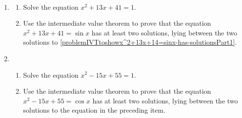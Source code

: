 ~
\begin{enumerate}[ref={\fcProblemRef}]
\item \label{problemIVTtoshowx^2+13x+14=sinx-has-solutions} 
\begin{enumerate}[ref={\fcSubProblemRef}]
\item \label{problemIVTtoshowx^2+13x+14=sinx-has-solutionsPart1} Solve the equation $x^2+13x+41=1$.  
\item \label{problemIVTtoshowx^2+13x+14=sinx-has-solutionsPart2} Use the intermediate value theorem to prove that the equation $x^2+13x+41=\sin  x$ has at least two solutions, lying between the two solutions to \ref{problemIVTtoshowx^2+13x+14=sinx-has-solutionsPart1}.
\end{enumerate}
\item 
\begin{enumerate}[ref={\fcSubProblemRef}]
\item Solve the equation $x^2-15x+55=1$.  
\item Use the intermediate value theorem to prove that the equation $x^2-15x+55=\cos  x$ has at least two solutions, lying between the two solutions to the equation in the preceding item.
\end{enumerate}
\end{enumerate}
